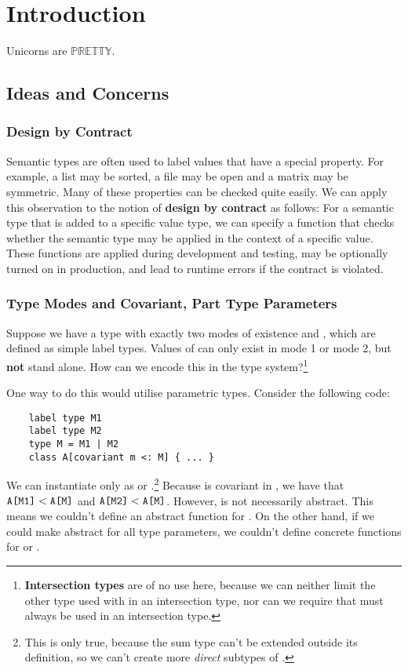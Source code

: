 \chapter{Introduction}

Unicorns are $\mathbb{PRETTY}$.



\section{Ideas and Concerns}

\subsection{Design by Contract}
Semantic types are often used to label values that have a special property. For example, a list may be sorted, a file may be open and a matrix may be symmetric. Many of these properties can be checked quite easily. We can apply this observation to the notion of \textbf{design by contract} as follows: For a semantic type that is added to a specific value type, we can specify a function that checks whether the semantic type may be applied in the context of a specific value. These functions are applied during development and testing, may be optionally turned on in production, and lead to runtime errors if the contract is violated.


\subsection{Type Modes and Covariant, Part Type Parameters}
Suppose we have a type  with exactly two modes of existence  and , which are defined as simple label types. Values of  can only exist in mode 1 or mode 2, but \textbf{not} stand alone. How can we encode this in the type system?\footnote{\textbf{Intersection types} are of no use here, because we can neither limit the other type used with  in an intersection type, nor can we require that  must always be used in an intersection type.}

One way to do this would utilise parametric types. Consider the following code:

\begin{lstlisting}
    label type M1
    label type M2
    type M = M1 | M2
    class A[covariant m <: M] { ... }
\end{lstlisting}

We can instantiate  only as  or .\footnote{This is only true, because the sum type can't be extended outside its definition, so we can't create more \textit{direct} subtypes of .} Because  is covariant in , we have that $\texttt{A[M1]} < \texttt{A[M]}$ and $\texttt{A[M2]} < \texttt{A[M]}$. However,  is not necessarily abstract. This means we couldn't define an abstract function for . On the other hand, if we could make  abstract for all type parameters, we couldn't define concrete functions for  or .

